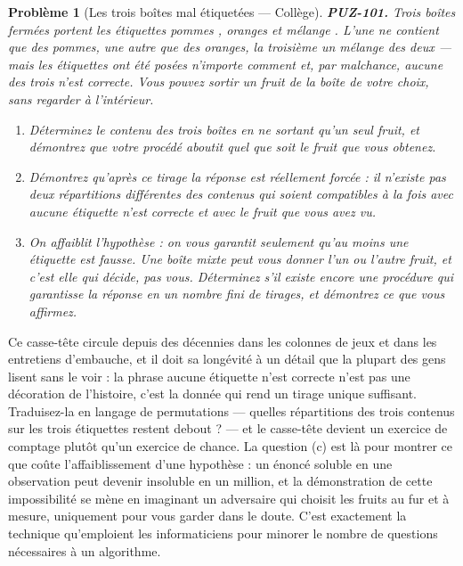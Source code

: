 \documentclass[11pt]{article}
\newtheorem{problem}{Problème}
\begin{document}
\begin{problem}[{Les trois boîtes mal étiquetées --- Collège}]
\textbf{PUZ-101.} Trois boîtes fermées portent les étiquettes \og{} pommes \fg{}, \og{} oranges \fg{} et
\og{} mélange \fg{}. L'une ne contient que des pommes, une autre que des oranges, la troisième un
mélange des deux --- mais les étiquettes ont été posées n'importe comment et, par malchance,
aucune des trois n'est correcte. Vous pouvez sortir un fruit de la boîte de votre choix, sans
regarder à l'intérieur.
\begin{enumerate}
\item[(a)] Déterminez le contenu des trois boîtes en ne sortant qu'un seul fruit, et démontrez que
votre procédé aboutit quel que soit le fruit que vous obtenez.
\item[(b)] Démontrez qu'après ce tirage la réponse est réellement forcée : il n'existe pas deux
répartitions différentes des contenus qui soient compatibles à la fois avec \og{} aucune
étiquette n'est correcte \fg{} et avec le fruit que vous avez vu.
\item[(c)] On affaiblit l'hypothèse : on vous garantit seulement qu'\textit{au moins} une étiquette est
fausse. Une boîte mixte peut vous donner l'un ou l'autre fruit, et c'est elle qui décide,
pas vous. Déterminez s'il existe encore une procédure qui garantisse la réponse en un nombre
fini de tirages, et démontrez ce que vous affirmez.
\end{enumerate}

\end{problem}

\noindent Ce casse-tête circule depuis des décennies dans les colonnes de jeux et
dans les entretiens d'embauche, et il doit sa longévité à un détail que la plupart des gens
lisent sans le voir : la phrase \og{} aucune étiquette n'est correcte \fg{} n'est pas une décoration
de l'histoire, c'est la donnée qui rend un tirage unique suffisant. Traduisez-la en langage de
permutations --- quelles répartitions des trois contenus sur les trois étiquettes restent
debout ? --- et le casse-tête devient un exercice de comptage plutôt qu'un exercice de chance.
La question (c) est là pour montrer ce que coûte l'affaiblissement d'une hypothèse : un énoncé
soluble en une observation peut devenir insoluble en un million, et la démonstration de cette
impossibilité se mène en imaginant un adversaire qui choisit les fruits au fur et à mesure,
uniquement pour vous garder dans le doute. C'est exactement la technique qu'emploient les
informaticiens pour minorer le nombre de questions nécessaires à un algorithme.
\end{document}
